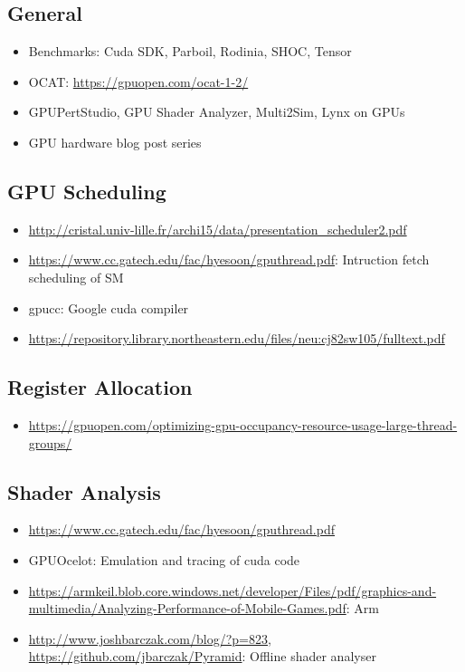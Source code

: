 \clearpage
{}
\label{sec:references}

\subsection{General}
\begin{itemize}
	\item Benchmarks: Cuda SDK, Parboil, Rodinia, SHOC, Tensor
	\item OCAT: \url{https://gpuopen.com/ocat-1-2/}
	\item GPUPertStudio, GPU Shader Analyzer, Multi2Sim, Lynx on GPUs
	\item GPU hardware blog post series~\cite{gpuBlogPost}
\end{itemize}

\subsection{GPU Scheduling}
\begin{itemize}
	\item \url{http://cristal.univ-lille.fr/archi15/data/presentation_scheduler2.pdf}
	\item \url{https://www.cc.gatech.edu/fac/hyesoon/gputhread.pdf}: Intruction fetch scheduling of SM
	\item gpucc: Google cuda compiler
	\item \url{https://repository.library.northeastern.edu/files/neu:cj82sw105/fulltext.pdf}
\end{itemize}

\subsection{Register Allocation}
\begin{itemize}
	\item \url{https://gpuopen.com/optimizing-gpu-occupancy-resource-usage-large-thread-groups/}
\end{itemize}

\subsection{Shader Analysis}
\begin{itemize}
	\item \url{https://www.cc.gatech.edu/fac/hyesoon/gputhread.pdf}
	\item GPUOcelot: Emulation and tracing of cuda code
	\item \url{https://armkeil.blob.core.windows.net/developer/Files/pdf/graphics-and-multimedia/Analyzing-Performance-of-Mobile-Games.pdf}: Arm
	\item \url{http://www.joshbarczak.com/blog/?p=823}, \url{https://github.com/jbarczak/Pyramid}: Offline shader analyser
\end{itemize}

